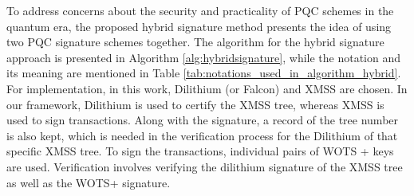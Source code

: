 \label{subsection:proposed_signature}
To address concerns about the security and practicality of PQC schemes in the quantum era, 
the proposed hybrid signature method
presents the idea of using two PQC signature schemes together. 
The algorithm for the hybrid signature approach is presented in Algorithm \ref{alg:hybridsignature},
while the notation and its meaning are mentioned in Table \ref{tab:notations_used_in_algorithm_hybrid}.
For implementation, in this work, Dilithium (or Falcon) and XMSS are chosen.
In our framework, Dilithium is used to certify the XMSS tree, whereas
XMSS is used to sign transactions.
Along with the signature, a record of the tree number is also kept, 
which is needed in the verification process for the Dilithium of that specific XMSS tree.
To sign the transactions, individual pairs of WOTS + keys are used.
Verification involves verifying the dilithium signature of the XMSS tree as well as the
WOTS+ signature.


